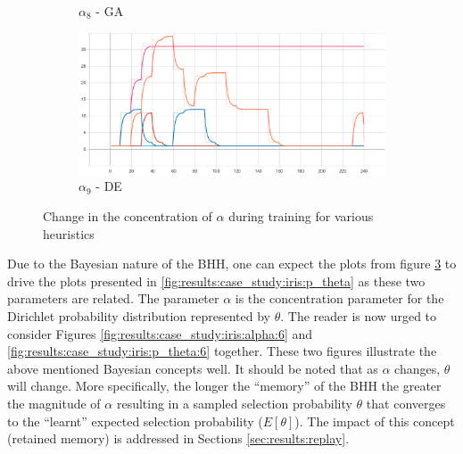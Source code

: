 \begin{figure}[htbp]
\begin{subfigure}{0.5\textwidth}
        \caption{$\alpha_{8}$ - \Acs{GA}}
        \label{fig:results:case_study:iris:alpha:8}
    \end{subfigure}
    \begin{subfigure}{0.5\textwidth}
        \centering
        \includegraphics[width=\textwidth]{analysis/bhh_case_study/iris/alpha[9].png}
        \caption{$\alpha_{9}$ - \Acs{DE}}
        \label{fig:results:case_study:iris:alpha:9}
    \end{subfigure}
    \par\bigskip
    \caption{Change in the concentration of $\alpha$ during training for various heuristics}
    \label{fig:results:case_study:iris:alpha}
\end{figure}

Due to the Bayesian nature of the \Acs{BHH}, one can expect the plots from figure \ref{fig:results:case_study:iris:alpha} to drive the plots presented in \ref{fig:results:case_study:iris:p_theta} as these two parameters are related. The parameter $\alpha$ is the concentration parameter for the Dirichlet probability distribution represented by $\theta$. The reader is now urged to consider Figures \ref{fig:results:case_study:iris:alpha:6} and \ref{fig:results:case_study:iris:p_theta:6} together. These two figures illustrate the above mentioned Bayesian concepts well. It should be noted that as $\alpha$ changes, $\theta$ will change. More specifically, the longer the ``memory'' of the \Acs{BHH} the greater the magnitude of $\alpha$ resulting in a sampled selection probability $\theta$ that converges to the ``learnt'' expected selection probability ($E\left[\theta\right]$). The impact of this concept (retained memory) is addressed in Sections \ref{sec:results:replay}.

